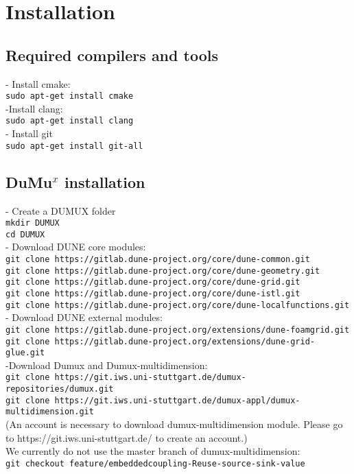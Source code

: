 \chapter*{Installation}
\section*{Required compilers and tools}
%
- Install cmake:\\
\lstinline{sudo apt-get install cmake}\\
-Install clang:\\
\lstinline{sudo apt-get install clang}\\
- Install git\\
\lstinline{sudo apt-get install git-all}\\

\section*{DuMu$^x$ installation}
- Create a DUMUX folder\\
\lstinline{mkdir DUMUX}\\
\lstinline{cd DUMUX}\\
- Download DUNE core modules:\\
\texttt{git clone https://gitlab.dune-project.org/core/dune-common.git}\\
\texttt{git clone https://gitlab.dune-project.org/core/dune-geometry.git}\\
\texttt{git clone https://gitlab.dune-project.org/core/dune-grid.git}\\
\texttt{git clone https://gitlab.dune-project.org/core/dune-istl.git}\\
\texttt{git clone https://gitlab.dune-project.org/core/dune-localfunctions.git}\\
- Download DUNE external modules:\\
\texttt{git clone https://gitlab.dune-project.org/extensions/dune-foamgrid.git}\\
\texttt{git clone https://gitlab.dune-project.org/extensions/dune-grid-glue.git}\\
-Download Dumux and Dumux-multidimension:\\
\texttt{git clone https://git.iws.uni-stuttgart.de/dumux-repositories/dumux.git}\\
\texttt{git clone https://git.iws.uni-stuttgart.de/dumux-appl/dumux-multidimension.git}\\
(An account is necessary to download dumux-multidimension module. Please go to https://git.iws.uni-stuttgart.de/ to create an account.)\\
We currently do not use the master branch of dumux-multidimension: \\
\texttt{git checkout feature/embeddedcoupling-Reuse-source-sink-value}\\



